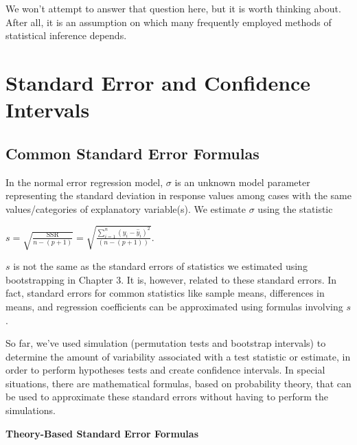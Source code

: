 \documentclass[
  letterpaper,
  DIV=11,
  numbers=noendperiod]{scrreprt}
\begin{document}
We won't attempt to answer that question here, but it is worth thinking
about. After all, it is an assumption on which many frequently employed
methods of statistical inference depends.

\section{Standard Error and Confidence
Intervals}\label{standard-error-and-confidence-intervals}

\subsection{Common Standard Error
Formulas}\label{common-standard-error-formulas}

In the normal error regression model, \(\sigma\) is an unknown model
parameter representing the standard deviation in response values among
cases with the same values/categories of explanatory variable(s). We
estimate \(\sigma\) using the statistic

\(s =\sqrt{\frac{\text{SSR}}{n-(p+1)}} = \sqrt{\frac{\displaystyle\sum_{i=1}^n(y_i-\hat{y}_i)^2}{(n-(p+1))}}\).

\(s\) is not the same as the standard errors of statistics we estimated
using bootstrapping in Chapter 3. It is, however, related to these
standard errors. In fact, standard errors for common statistics like
sample means, differences in means, and regression coefficients can be
approximated using formulas involving \(s\).

So far, we've used simulation (permutation tests and bootstrap
intervals) to determine the amount of variability associated with a test
statistic or estimate, in order to perform hypotheses tests and create
confidence intervals. In special situations, there are mathematical
formulas, based on probability theory, that can be used to approximate
these standard errors without having to perform the simulations.

\textbf{Theory-Based Standard Error Formulas}
\end{document}
